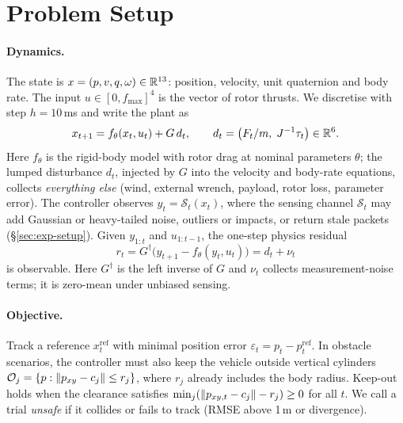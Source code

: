 \section{Problem Setup}
\label{sec:setup}

\paragraph{Dynamics.}
The state is $x=(p,v,q,\omega)\in\mathbb{R}^{13}$: position, velocity, unit quaternion and body rate. The input $u\in[0,f_{\max}]^4$ is the vector of rotor thrusts.
We discretise with step $h=10$\,ms and write the plant as
\begin{equation}
  x_{t+1} = f_\theta(x_t,u_t) + G\, d_t, \qquad d_t = \big(F_t/m,\; J^{-1}\tau_t\big)\in\mathbb{R}^6.
  \label{eq:plant}
\end{equation}
Here $f_\theta$ is the rigid-body model with rotor drag \citep{faessler2018differential,folk2023rotorpy} at nominal parameters $\theta$; the lumped disturbance $d_t$, injected by $G$ into the velocity and body-rate equations, collects \emph{everything else} (wind, external wrench, payload, rotor loss, parameter error).
The controller observes $y_t = \mathcal{S}_t(x_t)$, where the sensing channel $\mathcal{S}_t$ may add Gaussian or heavy-tailed noise, outliers or impacts, or return stale packets (\S\ref{sec:exp-setup}).
Given $y_{1:t}$ and $u_{1:t-1}$, the one-step physics residual
\begin{equation}
  r_t = G^{\dagger}\big(y_{t+1} - f_\theta(y_t,u_t)\big) = d_t + \nu_t
  \label{eq:residual}
\end{equation}
is observable. Here $G^\dagger$ is the left inverse of $G$ and $\nu_t$ collects measurement-noise terms; it is zero-mean under unbiased sensing.

\paragraph{Objective.}
Track a reference $x^{\mathrm{ref}}_t$ with minimal position error $\varepsilon_t = p_t - p^{\mathrm{ref}}_t$. In obstacle scenarios, the controller must also keep the vehicle outside vertical cylinders $\mathcal{O}_j=\{p:\left\lVert p_{xy}-c_j \right\rVert\le r_j\}$, where $r_j$ already includes the body radius. Keep-out holds when the clearance satisfies $\min_j(\left\lVert p_{xy,t}-c_j \right\rVert-r_j)\ge 0$ for all $t$.
We call a trial \emph{unsafe} if it collides or fails to track (RMSE above 1\,m or divergence).
